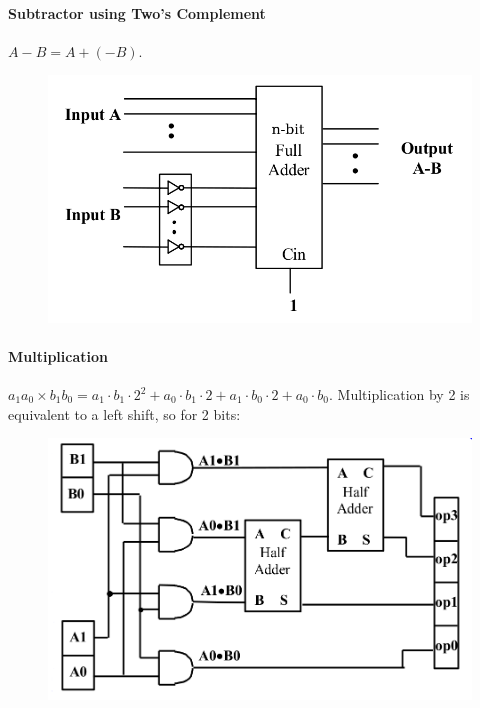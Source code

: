 \documentclass[twocolumn,english]{article}
\begin{document}
\paragraph{Subtractor using Two's Complement}

$A-B=A+\left(-B\right)$.

\begin{figure}[H]
\noindent \centering{}\includegraphics[width=0.2\paperwidth]{img/twocomplement-sub}
\end{figure}



\paragraph{Multiplication}

$a_{1}a_{0}\times b_{1}b_{0}=a_{1}\cdot b_{1}\cdot2^{2}+a_{0}\cdot b_{1}\cdot2+a_{1}\cdot b_{0}\cdot2+a_{0}\cdot b_{0}$.
Multiplication by 2 is equivalent to a left shift, so for 2 bits:

\begin{figure}[H]
\noindent \centering{}\includegraphics[width=0.25\paperwidth]{img/multiply2}
\end{figure}
\end{document}
